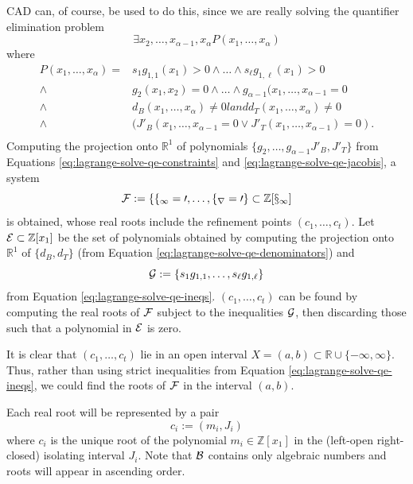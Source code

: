 \documentclass[
]{book}
\theoremstyle{definition}
\theoremstyle{definition}
\theoremstyle{definition}
\theoremstyle{definition}
\theoremstyle{remark}
\begin{document}
CAD can, of course, be used to do this, since we are really solving the quantifier elimination problem
\[
\exists x_2,\ldots,x_{\alpha - 1},x_\alpha P(x_1,\ldots,x_\alpha)
\] where
\begin{align}
P(x_1,\ldots,x_\alpha) = & s_1 g_{1,1}(x_1) > 0 \land \ldots \land s_\ell g_{1,\ell}(x_1) > 0
\label{eq:lagrange-solve-qe-ineqs} \\
\land & g_2(x_1,x_2) = 0 \land \ldots \land g_{\alpha - 1}(x_1,\ldots,x_{\alpha - 1} = 0
\label{eq:lagrange-solve-qe-constraints} \\
\land & d_B(x_1,\ldots,x_\alpha) \ne 0 land d_T(x_1,\ldots,x_\alpha) \ne 0
\label{eq:lagrange-solve-qe-denominators} \\
\land & ( J'_B(x_1,\ldots,x_{\alpha - 1} = 0 \lor J'_T(x_1,\ldots,x_{\alpha - 1}) = 0 ).
\label{eq:lagrange-solve-qe-jacobis} \\
\end{align}
Computing the projection onto \(\mathbb{R}^1\) of polynomials \(\{g_2,\ldots,g_{\alpha - 1} J'_B, J'_T \}\) from Equations \eqref{eq:lagrange-solve-qe-constraints} and \eqref{eq:lagrange-solve-qe-jacobis}, a system
\[
\cal{F} := \{ f_1=0 ,\ldots,f_r=0 \} \subset \mathbb{Z}[x_1]
\]
is obtained, whose real roots include the refinement points \((c_1,\ldots,c_t)\).
Let \({\cal E} \subset \mathbb{Z}[x_1]\) be the set of polynomials obtained by computing the projection onto \(\mathbb{R}^1\) of \(\{ d_B, d_T \}\) (from Equation \eqref{eq:lagrange-solve-qe-denominators}) and
\[{\cal G} := \{ s_1 g_{1,1}, \ldots, s_\ell g_{1,\ell} \}
\]
from Equation \eqref{eq:lagrange-solve-qe-ineqs}.
\((c_1,\ldots,c_t)\) can be found by computing the real roots of \(\cal F\) subject to the inequalities \(\cal G\), then discarding those such that a polynomial in \(\cal E\) is zero.

It is clear that \((c_1,\ldots,c_t)\) lie in an open interval \(X = (a,b) \subset \mathbb{R}\cup \{ -\infty, \infty \}\). Thus, rather than using strict inequalities from Equation \eqref{eq:lagrange-solve-qe-ineqs}, we could find the roots of \(\cal F\) in the interval \((a,b)\).

Each real root will be represented by a pair
\begin{equation}
c_i := (m_i,J_i)
\label{eq:algebraic-number}
\end{equation}
where \(c_i\) is the unique root of the polynomial \(m_i \in \mathbb{Z}[x_1]\) in the (left-open right-closed) isolating interval \(J_i\).
Note that \(\cal B\) contains only algebraic numbers and roots will appear in ascending order.
\end{document}
